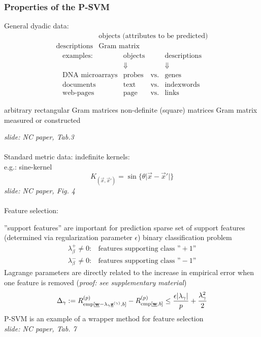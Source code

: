 \subsubsection{Properties of the P-SVM}
General dyadic data:
\[ \begin{array}{l|l}
				& \text{objects (attributes to be predicted)} \\
	\hline	
	\text{descriptions} 	& \text{Gram matrix}
\end{array} \]
\[\begin{array}{lcccc}
	\text{examples:} & \text{objects} && \text{descriptions} \\
	& \Downarrow && \Downarrow \\
	\text{DNA microarrays} & \text{probes} & \text{vs.} & \text{genes} \\
	\text{documents} & \text{text} & \text{vs.} & \text{indexwords}\\
	\text{web-pages} & \text{page} & \text{vs.} & \text{links}
\end{array} \]
\begin{itemize}
	\itR arbitrary rectangular Gram matrices
	\itR non-definite (square) matrices
	\itR Gram matrix measured or constructed
\end{itemize}
{\it slide: NC paper, Tab.3}
\\\\
Standard metric data: indefinite kernels:\\
e.g.: sine-kernel 
\[ K_{(\vec{x}, \vec{x}')} = \sin \big\{ 
	\theta \big| \vec{x} - \vec{x}' \big| \big\}
\]
{\it slide: NC paper, Fig. 4}
\\\\
Feature selection:
\begin{itemize}
	\itR ''support features'' are important for prediction
	\itR sparse set of support features (determined via regularization 
		parameter $\epsilon$)
	\itR binary classification problem
		\[ \begin{array}{ll}
			\lambda_\beta^+ \neq 0: 
			& \text{features supporting class ''}+1\text{''} \\
			\lambda_\beta^- \neq 0: 
			& \text{features supporting class ''}-1\text{''} 
		\end{array} \]
	\itR Lagrange parameters are directly related to the increase in 
		empirical error when one feature is removed
		({\it proof: see supplementary material})
		\[ \Delta_\gamma :=
			R_{\operatorname{emp}[\underline{\mathbf{w}} - \lambda_\gamma \underline{\mathbf{z}}^{(\gamma)}
			,b]}^{(p)}  - R_{\operatorname{emp} [\underline{\mathbf{w}},b]}^{(p)} \leq 
			\frac{\epsilon | \lambda_\gamma | }{p}
			+ \frac{\lambda_\gamma^2}{2}
		\]
	\itR P-SVM is an example of a wrapper method for feature selection\\
		{\it slide: NC paper, Tab. 7}
\end{itemize}


